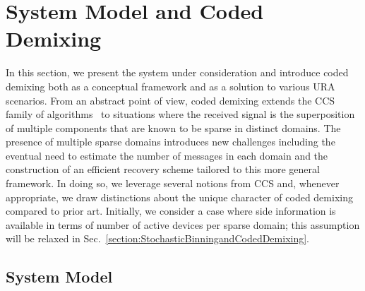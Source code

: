 \documentclass[journal]{IEEEtran}
\begin{document}
 
\section{System Model and Coded Demixing}
\label{section:CodedDemixing}

In this section, we present the system under consideration and introduce coded demixing both as a conceptual framework and as a solution to various URA scenarios.
From an abstract point of view, coded demixing extends the CCS family of algorithms~\cite{amalladinne2019coded,amalladinne2020unsourced,fengler2019sparcs} to situations where the received signal is the superposition of multiple components that are known to be sparse in distinct domains.
The presence of multiple sparse domains introduces new challenges including the eventual need to estimate the number of messages in each domain and the construction of an efficient recovery scheme tailored to this more general framework.
In doing so, we leverage several notions from CCS and, whenever appropriate, we draw distinctions about the unique character of coded demixing compared to prior art.
Initially, we consider a case where side information is available in terms of number of active devices per sparse domain; this assumption will be relaxed in Sec.~\ref{section:StochasticBinningandCodedDemixing}.

\subsection{System Model}
\label{section:SystemModel}
\end{document}
